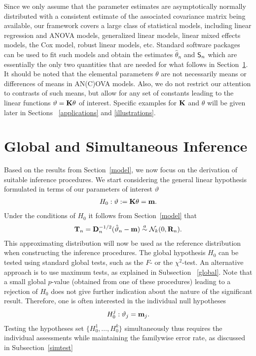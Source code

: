 \documentclass[bimj,fleqn]{w-art}
\begin{document}
Since we only assume that the parameter estimates are
asymptotically normally distributed with a consistent estimate of the
associated covariance matrix being available, our framework covers a large
class of statistical models, including linear regression and ANOVA models,
generalized linear models, linear mixed effects models, the Cox model,
robust linear models, etc. Standard software packages can be used to fit
such models and obtain the estimates $\hat{\theta}_n$ and $\textsf{S}_n$
which are essentially the only two quantities that are needed for what
follows in Section~\ref{siminf}. 
It should be noted that the elemental parameters $\theta$ are not
necessarily means or differences of means in AN(C)OVA models. Also, we do
not restrict our attention to contrasts of such means, but allow for any set
of constants leading to the linear functions $\vartheta = \mathbf{K}\theta $ of interest.
Specific examples for $\mathbf{K}$ and $\theta $ will be given later in Sections~%
\ref{applications} and \ref{illustrations}.

\section{Global and Simultaneous Inference}

\label{siminf}

Based on the results from Section~\ref{model}, we now focus on the
derivation of suitable inference procedures. We start considering the
general linear hypothesis \citep{Searle1971} formulated in terms
of our parameters of interest $\vartheta$
\begin{eqnarray*}
H_0: \vartheta := \mathbf{K} \theta = \mathbf{m}.
\end{eqnarray*}
Under the conditions of $H_0$ it follows from Section~\ref{model} that 
\begin{eqnarray*}
\mathbf{T}_n = \mathbf{D}_n^{-1/2} (\hat{\vartheta}_n - \mathbf{m}) \stackrel{a}{\sim} \mathcal{N}_k(0, \mathbf{R}_n). 
\end{eqnarray*}
This approximating distribution will now be used as the reference distribution when
constructing the inference procedures. The global hypothesis $H_0$ can be
tested using standard global tests, such as the $F$- or the $\chi^2$-test.
An alternative approach is to use maximum tests, as explained in Subsection~%
\ref{global}. Note that a small global $p$-value (obtained from one of these
procedures) leading to a rejection of $H_0$ 
does not give further indication about the nature of the significant
result. Therefore, one is often interested in the individual null hypotheses 
\begin{eqnarray*}
H_0^j: \vartheta_j = \mathbf{m}_j.
\end{eqnarray*}
Testing the hypotheses set $%
\{H_0^1, \ldots, H_0^k\}$ simultaneously thus requires the individual
assessments while maintaining the familywise error rate, as discussed in
Subsection~\ref{simtest}
\end{document}
